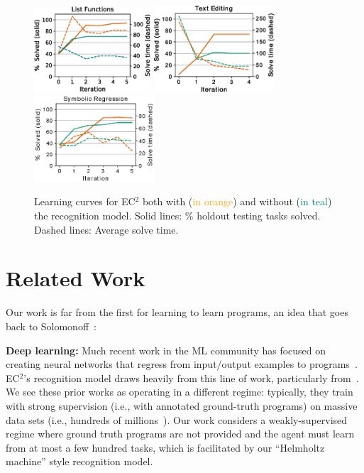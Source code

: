 \documentclass{article}
\newcommand{\system}{\textsc{EC$^2$} }
\newcommand{\systemEnding}{\textsc{EC$^2$}}
\newcommand{\orange}[1]{\textcolor{orange}{#1}}
\newcommand{\teal}[1]{\textcolor{teal}{#1}}
\begin{document}
\begin{figure}\centering
  \includegraphics[width = 4.35cm]{figures/listLearningCurve_color.eps}
  \includegraphics[width = 4.5cm]{figures/textLearningCurve.eps}
  \includegraphics[width = 4.5cm]{figures/rationalCurve.eps}
  \caption{Learning curves for \system both with (\orange{in orange}) and without
  (\teal{in teal}) the recognition model. Solid lines: \% holdout testing tasks solved. Dashed lines: Average solve time.}\label{learningCurves}
\end{figure}

\section{Related Work}
 Our work is far from the first for learning to learn programs,
 an idea that goes back to Solomonoff~\cite{solomonoff1989system}:

 \noindent \textbf{Deep learning:} Much recent work in the ML community has
 focused on creating neural networks that regress from
 input/output examples to programs~\cite{devlin2017robustfill,devlin2017neural,menon2013machine,balog2016deepcoder}. %
\systemEnding's recognition model draws heavily from this line of work, particularly from~\cite{menon2013machine}.
We see these prior works as operating in a different regime: typically, they train with strong supervision (i.e., with annotated ground-truth programs) on massive data sets (i.e., hundreds of millions~\cite{devlin2017robustfill}).
 Our work   considers a weakly-supervised regime where ground truth programs are not provided and
 the agent must learn from at most a few hundred tasks,
 which is facilitated by our ``Helmholtz machine'' style recognition model.%
 
\end{document}
